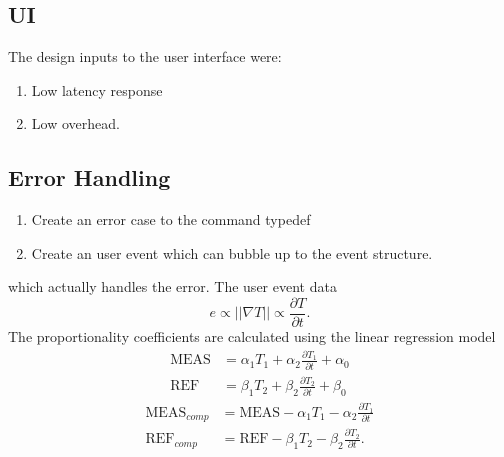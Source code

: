 \documentclass[a4paper,11pt]{article}
\begin{document}
\subsection{UI} \label{section:UI}
The design inputs to the user interface were:
\begin{enumerate}
\item Low latency response
\item Low overhead.
\end{enumerate}
\subsection{Error Handling} \label{section:error-handling}
\begin{enumerate}
\item Create an error case to the command typedef
\item Create an user event which can bubble up to the event structure.
\end{enumerate}
 which actually handles the error. The user event data
\pagebreak
\begin{equation}
  e \propto ||\nabla T|| \propto \frac{\partial T}{\partial t}.
\end{equation}
The proportionality coefficients are calculated using the linear
regression model
\begin{align}
  \mbox{MEAS} &= \alpha_1T_1 + \alpha_2\frac{\partial T_1}{\partial t} +
  \alpha_0 \\
  \mbox{REF} &= \beta_1T_2 + \beta_2\frac{\partial T_2}{\partial t} + \beta_0
\end{align}
\begin{align}
  \mbox{MEAS}_{comp} &= \mbox{MEAS} - \alpha_1T_1
  -\alpha_2\frac{\partial T_1}{\partial t} \\
  \mbox{REF}_{comp} &= \mbox{REF} - \beta_1T_2 - \beta_2\frac{\partial T_2}{\partial t}.
\end{align}
\end{document}
